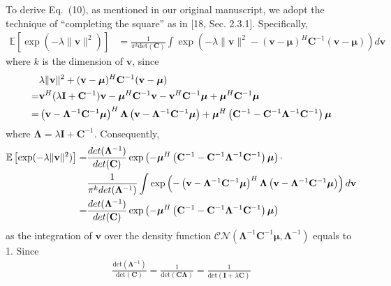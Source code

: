 \documentclass[onecolumn, 11pt, draftclsnofoot]{IEEEtran}
\begin{document}
To derive Eq.~(10), as mentioned in our original manuscript, we adopt the
technique of ``completing the square'' as in [18, Sec. 2.3.1]. Specifically,
\begin{align}
  \mathbb{E}\left[\exp(-\lambda\|\mathbf{v}\|^2)\right] & =
  \frac{1}{\pi^k\mbox{det}(\mathbf{C})}\int \exp\left(-\lambda\|\mathbf{v}\|^2 -
  (\mathbf{v} -
  \bm{\mu})^H\mathbf{C}^{-1} (\mathbf{v} - \bm{\mu})\right)d\mathbf{v}
\end{align}
where $k$ is the dimension of $\mathbf{v}$, since
\begin{align}
  & \lambda\|\mathbf{v}\|^2 + (\mathbf{v} - \bm{\mu})^H\mathbf{C}^{-1}
  (\mathbf{v} - \bm{\mu}) \notag \\
  =& \mathbf{v}^H
  (\lambda\mathbf{I} + \mathbf{C}^{-1})\mathbf{v} -
  \bm{\mu}^H\mathbf{C}^{-1}\mathbf{v} - \mathbf{v}^H\mathbf{C}^{-1}\bm{\mu} +
  \bm{\mu}^H\mathbf{C}^{-1}\bm{\mu} \notag\\
  =& \left(\mathbf{v} - \mathbf{\Lambda}^{-1}\mathbf{C}^{-1}\bm{\mu}\right)^H
  \mathbf{\Lambda} \left(\mathbf{v} -
  \mathbf{\Lambda}^{-1}\mathbf{C}^{-1}\bm{\mu}\right) +
  \bm{\mu}^H\left(\mathbf{C}^{-1} - \mathbf{C}^{-1} \mathbf{\Lambda}^{-1}
  \mathbf{C}^{-1} \right) \bm{\mu}
\end{align}
where $\mathbf{\Lambda} = \lambda\mathbf{I} + \mathbf{C}^{-1}$. Consequently,
\begin{align}
  \mathbb{E}\left[\exp(-\lambda\|\mathbf{v}\|^2)\right] = &
  \frac{\relax{det}(\mathbf{\Lambda}^{-1})}{\relax{det}(\mathbf{C})}
  \exp\left(-\bm{\mu}^H\left(\mathbf{C}^{-1} - \mathbf{C}^{-1} \mathbf{\Lambda}^{-1}
  \mathbf{C}^{-1} \right) \bm{\mu} \right) \cdot
  \notag \\
  & \frac{1}{\pi^k\relax{det}(\mathbf{\Lambda}^{-1})} \int
  \exp\left(-\left(\mathbf{v} -
  \mathbf{\Lambda}^{-1}\mathbf{C}^{-1}\bm{\mu}\right)^H \mathbf{\Lambda}
  \left(\mathbf{v} - \mathbf{\Lambda}^{-1}\mathbf{C}^{-1}\bm{\mu}\right) \right)
  d\mathbf{v} \notag \\
  = & \frac{\relax{det}(\mathbf{\Lambda}^{-1})}{\relax{det}(\mathbf{C})}
  \exp\left(-\bm{\mu}^H\left(\mathbf{C}^{-1} - \mathbf{C}^{-1} \mathbf{\Lambda}^{-1}
  \mathbf{C}^{-1} \right) \bm{\mu} \right) 
\end{align}
as the integration of $\mathbf{v}$ over the density function
$\mathcal{CN}(\mathbf{\Lambda}^{-1}\mathbf{C}^{-1}\bm{\mu},
\mathbf{\Lambda}^{-1})$ equals to 1. Since 
\begin{align}
  \frac{\mbox{det}(\mathbf{\Lambda}^{-1})}{\mbox{det}(\mathbf{C})} =
  \frac{1}{\mbox{det}(\mathbf{C\Lambda})} =
  \frac{1}{\mbox{det}(\mathbf{I} + \lambda \mathbf{C})}
\end{align}
\end{document}
